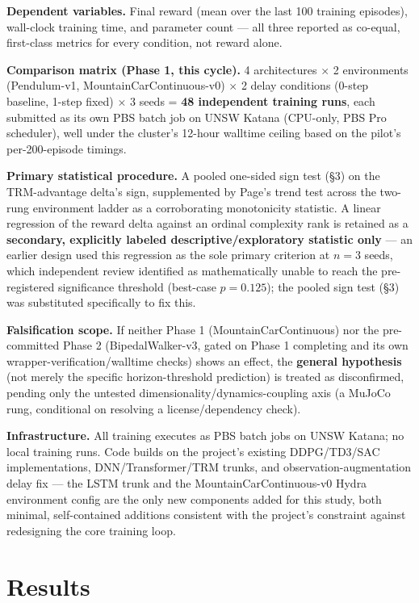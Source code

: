 \documentclass[11pt]{article}
\begin{document}
\textbf{Dependent variables.} Final reward (mean over the last 100 training episodes), wall-clock training time, and parameter count --- all three reported as co-equal, first-class metrics for every condition, not reward alone.

\textbf{Comparison matrix (Phase 1, this cycle).} 4 architectures $\times$ 2 environments (Pendulum-v1, MountainCarContinuous-v0) $\times$ 2 delay conditions (0-step baseline, 1-step fixed) $\times$ 3 seeds = \textbf{48 independent training runs}, each submitted as its own PBS batch job on UNSW Katana (CPU-only, PBS Pro scheduler), well under the cluster's 12-hour walltime ceiling based on the pilot's per-200-episode timings.

\textbf{Primary statistical procedure.} A pooled one-sided sign test (\S3) on the TRM-advantage delta's sign, supplemented by Page's trend test across the two-rung environment ladder as a corroborating monotonicity statistic. A linear regression of the reward delta against an ordinal complexity rank is retained as a \textbf{secondary, explicitly labeled descriptive/exploratory statistic only} --- an earlier design used this regression as the sole primary criterion at $n=3$ seeds, which independent review identified as mathematically unable to reach the pre-registered significance threshold (best-case $p = 0.125$); the pooled sign test (\S3) was substituted specifically to fix this.

\textbf{Falsification scope.} If neither Phase 1 (MountainCarContinuous) nor the pre-committed Phase 2 (BipedalWalker-v3, gated on Phase 1 completing and its own wrapper-verification/walltime checks) shows an effect, the \textbf{general hypothesis} (not merely the specific horizon-threshold prediction) is treated as disconfirmed, pending only the untested dimensionality/dynamics-coupling axis (a MuJoCo rung, conditional on resolving a license/dependency check).

\textbf{Infrastructure.} All training executes as PBS batch jobs on UNSW Katana; no local training runs. Code builds on the project's existing DDPG/TD3/SAC implementations, DNN/Transformer/TRM trunks, and observation-augmentation delay fix --- the LSTM trunk and the MountainCarContinuous-v0 Hydra environment config are the only new components added for this study, both minimal, self-contained additions consistent with the project's constraint against redesigning the core training loop.

\section{Results}
\label{sec:results}
\end{document}
